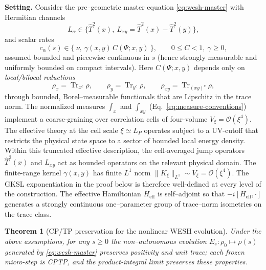 \documentclass[12pt,a4paper]{article}
\newtheorem{theorem}{Theorem}[section]
\renewcommand{\Tr}{\operatorname{Tr}}
\numberwithin{equation}{section}
\begin{document}
\begingroup
\setcounter{equation}{0}
\renewcommand\theequation{E.\arabic{equation}}
\renewcommand{\theHequation}{E.\arabic{equation}}
\setcounter{theorem}{0}
\renewcommand\thetheorem{E.\arabic{theorem}}
\renewcommand{\theHtheorem}{E.\arabic{theorem}}
\setcounter{lemma}{0}
\renewcommand\thelemma{E.\arabic{lemma}}
\renewcommand{\theHlemma}{E.\arabic{lemma}}
\setcounter{remark}{0}
\renewcommand\theremark{E.\arabic{remark}}
\renewcommand{\theHremark}{E.\arabic{remark}}
\setcounter{corollary}{0}
\renewcommand\thecorollary{E.\arabic{corollary}}
\renewcommand{\theHcorollary}{E.\arabic{corollary}}
\setcounter{proposition}{0}
\renewcommand\theproposition{E.\arabic{proposition}}
\renewcommand{\theHproposition}{E.\arabic{proposition}}

\vspace{0.5cm}
\noindent\textbf{Setting.}
Consider the pre–geometric master equation \eqref{eq:wesh-master} with Hermitian channels
\[
L_\alpha\in\big\{\hat T^2(x),\ L_{xy}=\hat T^2(x)-\hat T^2(y)\big\},
\]
and scalar rates
\[
c_\alpha(s)\in\{\ \nu,\ \gamma(x,y)\,C(\Psi;x,y)\ \},\qquad 0\le C<1,\ \gamma\ge0,
\]
assumed bounded and piecewise continuous in $s$ (hence strongly measurable and uniformly bounded on compact intervals). Here $C(\Psi;x,y)$ depends only on \emph{local/bilocal reductions}
\[
\rho_x=\Tr_{x^c}\rho,\qquad \rho_y=\Tr_{y^c}\rho,\qquad \rho_{xy}=\Tr_{(xy)^c}\rho,
\]
through bounded, Borel–measurable functionals that are Lipschitz in the trace norm. The normalized measures $\int_x$ and $\int_{xy}$ (Eq.~\eqref{eq:measure-conventions}) implement a coarse-graining over correlation cells of four-volume $V_\xi = \mathcal{O}(\xi^4)$. The effective theory at the cell scale $\xi \simeq L_P$ operates subject to a UV-cutoff that restricts the physical state space to a sector of bounded local energy density. Within this truncated effective description, the cell-averaged jump operators $\hat{T}^2(x)$ and $L_{xy}$ act as bounded operators on the relevant physical domain. The finite-range kernel $\gamma(x,y)$ has finite $L^1$ norm $\|K_\xi\|_{L^1} \sim V_\xi = \mathcal{O}(\xi^4)$. The GKSL exponentiation in the proof below is therefore well-defined at every level of the construction. The effective Hamiltonian $H_{\mathrm{eff}}$ is self–adjoint so that $-i[H_{\mathrm{eff}},\cdot]$ generates a strongly continuous one–parameter group of trace–norm isometries on the trace class.

\begin{theorem}[CP/TP preservation for the nonlinear WESH evolution]\label{thm:H-CPTP}
Under the above assumptions, for any $s\ge0$ the non–autonomous evolution $E_s:\rho_0\mapsto\rho(s)$ generated by \eqref{eq:wesh-master} preserves positivity and unit trace; each frozen micro-step is CPTP, and the product-integral limit preserves these properties.
\end{theorem}
\end{document}
